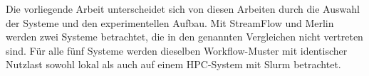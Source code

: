 Die vorliegende Arbeit unterscheidet sich von diesen Arbeiten
durch die Auswahl der Systeme und den experimentellen Aufbau.
Mit StreamFlow und Merlin werden zwei Systeme betrachtet, die in
den genannten Vergleichen nicht vertreten sind. Für alle fünf
Systeme werden dieselben Workflow-Muster mit identischer Nutzlast
sowohl lokal als auch auf einem HPC-System mit Slurm betrachtet.